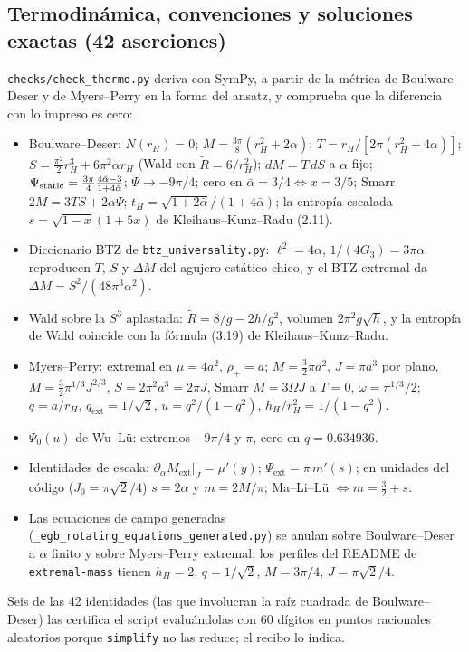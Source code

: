 \documentclass[10pt,a4paper]{article}
\newcommand{\code}[1]{\texttt{#1}}
\newcommand{\ext}{\mathrm{ext}}
\begin{document}
\subsection{Termodinámica, convenciones y soluciones exactas (42 aserciones)}

\code{checks/check\_thermo.py} deriva con SymPy, a partir de la métrica de Boulware--Deser y de
Myers--Perry en la forma del ansatz, y comprueba que la diferencia con lo impreso es cero:
\begin{itemize}
\item Boulware--Deser: $N(r_H)=0$; $M=\tfrac{3\pi}{8}(r_H^2+2\alpha)$; $T=r_H/[2\pi(r_H^2+4\alpha)]$;
 $S=\tfrac{\pi^2}{2}r_H^3+6\pi^2\alpha r_H$ (Wald con $\tilde R=6/r_H^2$); $dM=T\,dS$ a $\alpha$ fijo;
 $\Psi_{\rm static}=\tfrac{3\pi}{4}\frac{4\bar\alpha-3}{1+4\bar\alpha}$; $\Psi\to-9\pi/4$;
 cero en $\bar\alpha=3/4\Leftrightarrow x=3/5$; Smarr $2M=3TS+2\alpha\Psi$;
 $t_H=\sqrt{1+2\bar\alpha}/(1+4\bar\alpha)$; la entropía escalada $s=\sqrt{1-x}(1+5x)$ de
 Kleihaus--Kunz--Radu (2.11).
\item Diccionario BTZ de \code{btz\_universality.py}: $\ell^2=4\alpha$, $1/(4G_3)=3\pi\alpha$
 reproducen $T$, $S$ y $\Delta M$ del agujero estático chico, y el BTZ extremal da
 $\Delta M=S^2/(48\pi^3\alpha^2)$.
\item Wald sobre la $S^3$ aplastada: $\tilde R=8/g-2h/g^2$, volumen $2\pi^2g\sqrt h$, y la
 entropía de Wald coincide con la fórmula (3.19) de Kleihaus--Kunz--Radu.
\item Myers--Perry: extremal en $\mu=4a^2$, $\rho_+=a$; $M=\tfrac32\pi a^2$, $J=\pi a^3$ por plano,
 $M=\tfrac32\pi^{1/3}J^{2/3}$, $S=2\pi^2a^3=2\pi J$, Smarr $M=3\Omega J$ a $T=0$,
 $\omega=\pi^{1/3}/2$; $q=a/r_H$, $q_\ext=1/\sqrt2$, $u=q^2/(1-q^2)$, $h_H/r_H^2=1/(1-q^2)$.
\item $\Psi_0(u)$ de Wu--L\"u: extremos $-9\pi/4$ y $\pi$, cero en $q=0.634936$.
\item Identidades de escala: $\partial_\alpha M_\ext|_J=\mu'(y)$; $\Psi_\ext=\pi\,m'(s)$; en unidades
 del código ($J_0=\pi\sqrt2/4$) $s=2\alpha$ y $m=2M/\pi$; Ma--Li--L\"u $\Leftrightarrow m=\tfrac32+s$.
\item Las ecuaciones de campo generadas (\code{\_egb\_rotating\_equations\_generated.py}) se anulan
 sobre Boulware--Deser a $\alpha$ finito y sobre Myers--Perry extremal; los perfiles del README de
 \code{extremal-mass} tienen $h_H=2$, $q=1/\sqrt2$, $M=3\pi/4$, $J=\pi\sqrt2/4$.
\end{itemize}
Seis de las 42 identidades (las que involucran la raíz cuadrada de Boulware--Deser) las certifica
el script evaluándolas con 60 dígitos en puntos racionales aleatorios porque \code{simplify} no las
reduce; el recibo lo indica.
\end{document}
